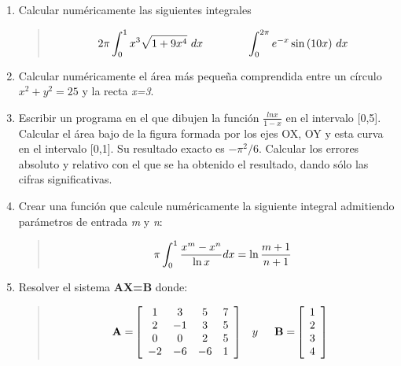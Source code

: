 \documentclass[letterpaper,10pt,spanish]{sphinxmanual}
\begin{document}
\label{calculo_numerico:ejercicios}\begin{enumerate}
\item {} 
Calcular numéricamente las siguientes integrales
\begin{quote}
\begin{gather}
\begin{split}2\pi \int_0^1 x^3 \sqrt{1 + 9x^4}~dx   ~~~~~~~~~~~~   \int_0^{2\pi}e^{-x} \sin{(10x)}~dx\end{split}\notag
\end{gather}\end{quote}

\item {} 
Calcular numéricamente el área más pequeña comprendida entre un círculo $x^2 + y^2 = 25$ y la recta \emph{x=3}.

\item {} 
Escribir un programa en el que dibujen la función $\frac {ln x}{1-x}$ en el intervalo {[}0,5{]}. Calcular el área bajo de la figura formada por los ejes OX, OY y esta curva en el intervalo {[}0,1{]}. Su resultado exacto es $-\pi^2/6$. Calcular los errores absoluto y relativo con el que se ha obtenido el resultado, dando sólo las cifras significativas.

\item {} 
Crear una función que calcule numéricamente la siguiente integral admitiendo parámetros de entrada \emph{m} y \emph{n}:
\begin{quote}
\begin{gather}
\begin{split}\pi \int_0^1 \frac{x^m - x^n}{\ln{x}} dx  = \ln{\frac{m+1}{n+1}}\end{split}\notag
\end{gather}\end{quote}

\item {} 
Resolver el sistema \textbf{AX=B} donde:
\begin{quote}
\begin{gather}
\begin{split}\begin{array}{ccc}
\mathbf{A=}
\left[
\begin{array}{cccc}
1 & 3 & 5 & 7\\
2 & -1 & 3 & 5\\
0 & 0 & 2 & 5\\
-2 & -6 & -6 & 1
\end{array}
\right] & y &
\begin{array}{ccc}
\mathbf{B=}
\left[
\begin{array}{c}
1\\
2 \\
3\\
4
\end{array}
\right]
\end{array}
\end{array}\end{split}\notag
\end{gather}\end{quote}

\end{enumerate}



\renewcommand{\indexname}{Índice}
\printindex
\end{document}
